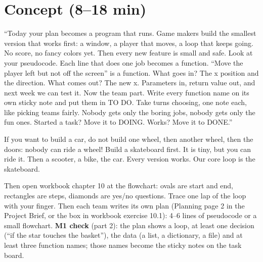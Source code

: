 \section{Concept (8--18 min)}
\begin{teacherscript}
“Today your plan becomes a program that runs. Game makers build the smallest version that works
first: a window, a player that moves, a loop that keeps going. No score, no fancy colors yet. Then
every new feature is small and safe. Look at your pseudocode. Each line that does one job becomes a function. \enquote{Move the player
left but not off the screen} is a function. What goes in? The x position and the direction. What
comes out? The new x. Parameters in, return value out, and next week we can test it. Now the team part. Write every function name on its own sticky note and put them in TO DO. Take
turns choosing, one note each, like picking teams fairly. Nobody gets only the boring jobs, nobody
gets only the fun ones. Started a task? Move it to DOING. Works? Move it to DONE.”
\end{teacherscript}

\begin{analogy}
If you want to build a car, do not build one wheel, then another wheel, then the doors: nobody can
ride a wheel! Build a skateboard first. It is tiny, but you can ride it. Then a scooter, a bike,
the car. Every version works. Our core loop is the skateboard.
\end{analogy}

Then open workbook chapter 10 at the flowchart: ovals are start and end, rectangles are steps,
diamonds are yes/no questions. Trace one lap of the loop with your finger. Then each team writes its
own plan (Planning page 2 in the Project Brief, or the box in workbook exercise 10.1): 4--6 lines of
pseudocode or a small flowchart. \textbf{M1 check} (part 2): the plan shows a loop, at least one
decision (\enquote{if the star touches the basket}), the data (a list, a dictionary, a file) and at
least three function names; those names become the sticky notes on the task board.

